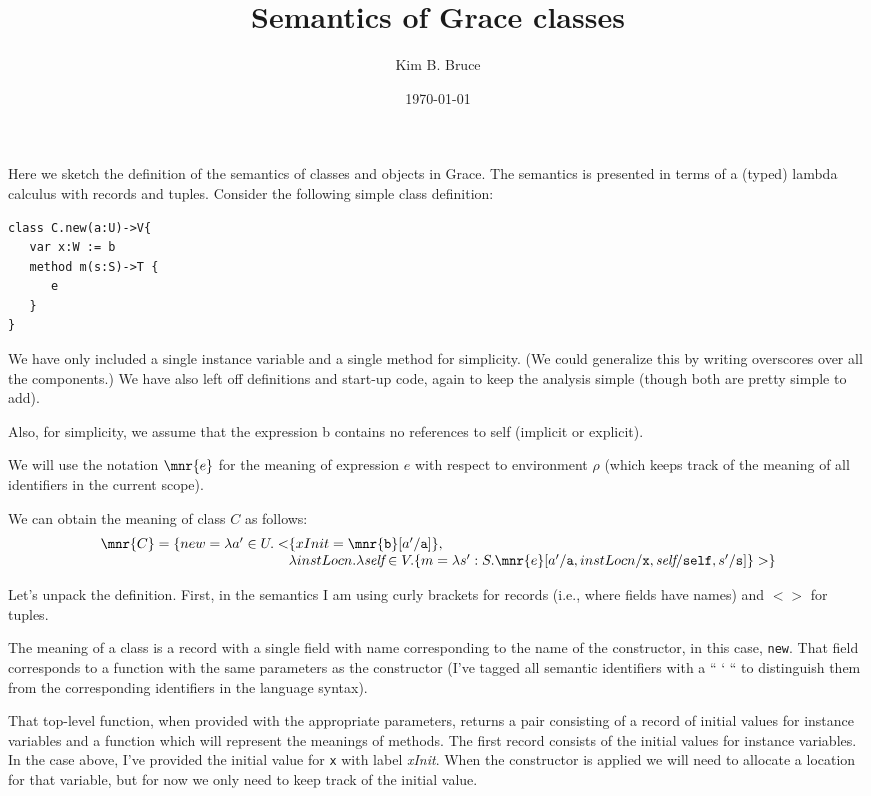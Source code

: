 \documentclass[11pt]{article}
\author{Kim B. Bruce}
\date{\today}
\title{Semantics of Grace classes}
\begin{document}

\maketitle

Here we sketch the definition of the semantics of classes and objects
in Grace.  The semantics is presented in terms of a (typed) lambda
calculus with records and tuples.  Consider the following simple 
class definition:

\begin{lstlisting}
class C.new(a:U)->V{
   var x:W := b
   method m(s:S)->T {
      e
   }
}
\end{lstlisting}

We have only included a single instance variable and a single method
for simplicity.  (We could generalize this by writing overscores
over all the components.)  We have also left off definitions and
start-up code, again to keep the analysis simple (though both
are pretty simple to add).

Also, for simplicity, we assume that the expression b contains no 
references to self (implicit or explicit).

We will use the notation $\mnr{e}$ for the meaning of expression $e$ 
with respect to environment $\rho$ (which keeps track of the meaning 
of all identifiers in the current scope).

We can obtain the meaning of class $C$ as follows:
$$\begin{array}{l@{}l}
\mnr{C} = \{new = \lambda a' \in U.<&\{xInit = 
\mnr{\texttt{b}}[a'/\texttt{a}]\}, \\
&\lambda instLocn.\lambda \textit{self}
\in V.\{m = \lambda
s':S.\mnr{e}[a'/\texttt{a},instLocn/\texttt{x},\textit{self}/\texttt{self},s'/\texttt{s}]\}>\}
\end{array}$$

Let's unpack the definition.  First, in the semantics I am using curly
brackets for records (i.e., where fields have names) and 
$<>$ for tuples.

The meaning of a class is a record with a single field with name 
corresponding to the name of the constructor, in this case, 
\texttt{new}.  That field corresponds to a function with the same 
parameters as the constructor (I've tagged all semantic identifiers 
with a `` ` `` to distinguish them from the corresponding identifiers 
in the language syntax).

That top-level function, when provided with the appropriate parameters, returns
a pair consisting of a record of initial values for instance variables
and a function which will represent the meanings of
methods.  The first record consists of the initial values for instance
variables.  In the case above, I've provided the initial value for
\texttt{x} with label \textit{xInit}.  When the constructor is applied
we will need to allocate a location for that variable, but for now we
only need to keep track of the initial value.
\end{document}
